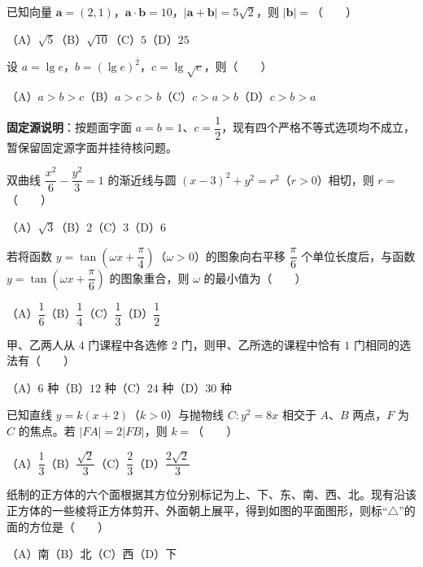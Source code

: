 \begin{question}
已知向量 $\boldsymbol a=(2,1)$，$\boldsymbol a\cdot\boldsymbol b=10$，$|\boldsymbol a+\boldsymbol b|=5\sqrt2$，则 $|\boldsymbol b|=$\mbox{（　　）}

（A）$\sqrt5$\quad（B）$\sqrt{10}$\quad（C）$5$\quad（D）$25$

\end{question}
\begin{question}
设 $a=\lg e$，$b=(\lg e)^2$，$c=\lg\sqrt e$，则\mbox{（　　）}

（A）$a>b>c$\quad（B）$a>c>b$\quad（C）$c>a>b$\quad（D）$c>b>a$

\begin{gktip}
\textbf{固定源说明}：按题面字面 $a=b=1$、$c=\dfrac12$，现有四个严格不等式选项均不成立，暂保留固定源字面并挂待核问题。
\end{gktip}

\end{question}
\begin{question}
双曲线 $\dfrac{x^2}{6}-\dfrac{y^2}{3}=1$ 的渐近线与圆 $(x-3)^2+y^2=r^2$（$r>0$）相切，则 $r=$\mbox{（　　）}

（A）$\sqrt3$\quad（B）$2$\quad（C）$3$\quad（D）$6$

\end{question}
\begin{question}
若将函数 $y=\tan\left(\omega x+\dfrac\pi4\right)$（$\omega>0$）的图象向右平移 $\dfrac\pi6$ 个单位长度后，与函数 $y=\tan\left(\omega x+\dfrac\pi6\right)$ 的图象重合，则 $\omega$ 的最小值为\mbox{（　　）}

（A）$\dfrac16$\quad（B）$\dfrac14$\quad（C）$\dfrac13$\quad（D）$\dfrac12$

\end{question}
\begin{question}
甲、乙两人从 $4$ 门课程中各选修 $2$ 门，则甲、乙所选的课程中恰有 $1$ 门相同的选法有\mbox{（　　）}

（A）$6$ 种\quad（B）$12$ 种\quad（C）$24$ 种\quad（D）$30$ 种

\end{question}
\begin{question}
已知直线 $y=k(x+2)$（$k>0$）与抛物线 $C:y^2=8x$ 相交于 $A\text{、}B$ 两点，$F$ 为 $C$ 的焦点。若 $|FA|=2|FB|$，则 $k=$\mbox{（　　）}

（A）$\dfrac13$\quad（B）$\dfrac{\sqrt2}{3}$\quad（C）$\dfrac23$\quad（D）$\dfrac{2\sqrt2}{3}$

\Needspace{0.4\textheight}
\end{question}
\begin{question}
纸制的正方体的六个面根据其方位分别标记为上、下、东、南、西、北。现有沿该正方体的一些棱将正方体剪开、外面朝上展平，得到如图的平面图形，则标“$\triangle$”的面的方位是\mbox{（　　）}
\nopagebreak[4]
\begin{center}\end{center}
\nopagebreak[4]
（A）南\quad（B）北\quad（C）西\quad（D）下

\end{question}

